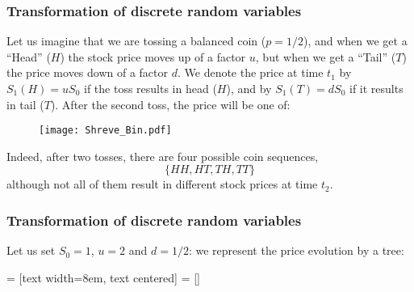\documentclass[notes=show,smaller,handout]{beamer}\usepackage[]{graphicx}\usepackage[]{color}
\begin{document}
\begin{frame}%
\frametitle{Transformation of discrete random variables}
\begin{example} 

Let us imagine that we are tossing a balanced coin ($p=1/2$), and when we get a ``Head'' ($H$) the stock price moves up of a factor $u$, but when we get a ``Tail'' ($T$) the price moves down of a factor $d$. We denote the price at time $t_1$  by $S_1(H)=u S_0 $ if the toss results in head ($H$), and by $S_1(T)=d S_0 $  if it results in tail ($T$). After the second toss, the price will be one of:
\begin{figure}[ptb]\centering
\texttt{[image: Shreve\_Bin.pdf]}%
\end{figure}%
Indeed, after two tosses, there are four possible coin sequences,
$$
\{HH,HT,TH,TT\}
$$
although not all of them result in different stock prices at time  $t_2$.
%
\end{example}
\end{frame}%





\begin{frame}%
\frametitle{Transformation of discrete random variables}
\begin{example}[cont'd]
Let us set $S_0=1$, $u=2$ and $d=1/2$: we represent the price evolution by a tree:


%
 = [text width=8em, text centered]
 = []
\end{example}
\end{frame}%
\end{document}
